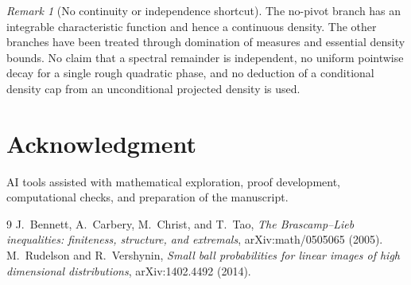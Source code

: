 \documentclass[11pt]{article}
\numberwithin{equation}{section}
\theoremstyle{definition}\newtheorem{definition}[theorem]{Definition}
\theoremstyle{remark}\newtheorem{remark}[theorem]{Remark}
\newcommand{\1}{\mathbf 1}\newcommand{\diag}{\operatorname{diag}}
\begin{document}
\begin{remark}[No continuity or independence shortcut]
The no-pivot branch has an integrable characteristic function and hence a continuous density. The other branches have been treated through domination of measures and essential density bounds. No claim that a spectral remainder is independent, no uniform pointwise decay for a single rough quadratic phase, and no deduction of a conditional density cap from an unconditional projected density is used.
\end{remark}

\section*{Acknowledgment}
AI tools assisted with mathematical exploration, proof development, computational checks, and preparation of the manuscript.

\begin{thebibliography}{9}
 J.~Bennett, A.~Carbery, M.~Christ, and T.~Tao,
\emph{The Brascamp--Lieb inequalities: finiteness, structure, and extremals},
arXiv:math/0505065 (2005).
 M.~Rudelson and R.~Vershynin,
\emph{Small ball probabilities for linear images of high dimensional distributions},
arXiv:1402.4492 (2014).
\end{thebibliography}
\end{document}

